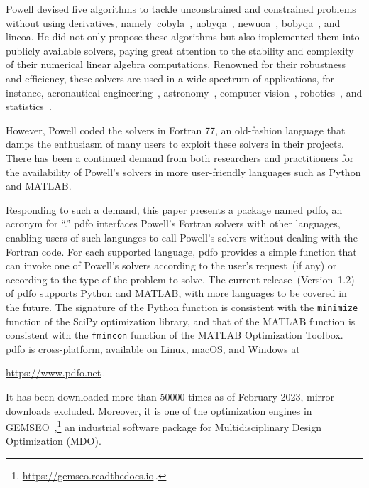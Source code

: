 \documentclass[
    smallextended,  %
    draft,          %
    final,          %
]{svjour3}
\begin{document}
Powell devised five algorithms to tackle unconstrained and constrained problems without using derivatives, namely~\gls{cobyla}~\cite{Powell_1994}, \gls{uobyqa}~\cite{Powell_2002}, \gls{newuoa}~\cite{Powell_2006}, \gls{bobyqa}~\cite{Powell_2009}, and \gls{lincoa}.
He did not only propose these algorithms but also implemented them into publicly available solvers, paying great attention to the stability and complexity of their numerical linear algebra computations.
Renowned for their robustness and efficiency, these solvers are used in a wide spectrum of applications, for instance, aeronautical engineering~\cite{Gallard_Etal_2018}, astronomy~\cite{Mamon_Biviano_Boue_2013}, computer vision~\cite{Izadinia_Shan_Seitz_2017}, robotics~\cite{Mombaur_Truong_Laumond_2010}, and statistics~\cite{Bates_Etal_2015}.

However, Powell coded the solvers in Fortran 77, an old-fashion language that damps the enthusiasm of many users to exploit these solvers in their projects.
There has been a continued demand from both researchers and practitioners for the availability of Powell's solvers in more user-friendly languages such as Python and MATLAB.

Responding to such a demand, this paper presents a package named \gls{pdfo}, an acronym for ``.''
\gls{pdfo} interfaces Powell's Fortran solvers with other languages,
enabling users of such languages to call Powell's solvers without dealing with the Fortran code.
For each supported language, \gls{pdfo} provides a simple function that can invoke one of Powell's
solvers according to the user's request~(if any) or according to the type of the problem to solve.
The current release~(Version~1.2) of \gls{pdfo} supports Python and MATLAB, with more languages to be covered in the future.
The signature of the Python function is consistent with the \texttt{minimize} function of the SciPy
optimization library, and that of the MATLAB function is consistent with the \texttt{fmincon} function of the MATLAB Optimization Toolbox.
\gls{pdfo} is cross-platform, available on Linux, macOS, and Windows at
\begin{center}
    \url{https://www.pdfo.net}\,.
\end{center}
It has been downloaded more than \num{50000} times as of February 2023, mirror downloads excluded.
Moreover, it is one of the optimization engines in GEMSEO~\cite{Gallard_Etal_2018},\footnote{\url{https://gemseo.readthedocs.io}\,.}
an industrial software package for Multidisciplinary Design Optimization (MDO).
\end{document}
